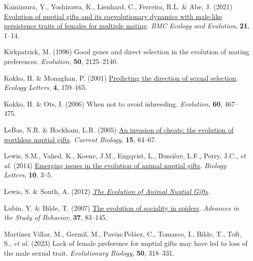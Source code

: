 \documentclass[
]{article}
\newlength{\cslhangindent}
\newlength{\cslentryspacingunit} %
\newenvironment{CSLReferences}[2] %
 {%
  \setlength{\parindent}{0pt}
  \ifodd #1
  \let\oldpar\par
  \def\par{\hangindent=\cslhangindent\oldpar}
  \fi
  \setlength{\parskip}{#2\cslentryspacingunit}
 }%
 {}
\begin{document}
\begin{CSLReferences}{0}{0}
\leavevmode{}%
Kamimura, Y., Yoshizawa, K., Lienhard, C., Ferreira, R.L. \& Abe, J.
(2021) \href{https://doi.org/10.1186/s12862-021-01901-x}{{Evolution of
nuptial gifts and its coevolutionary dynamics with male-like persistence
traits of females for multiple mating}}. \emph{BMC Ecology and
Evolution}, \textbf{21}, 1--14.

\leavevmode{}%
Kirkpatrick, M. (1996) Good genes and direct selection in the evolution
of mating preferences. \emph{Evolution}, \textbf{50}, 2125--2140.

\leavevmode{}%
Kokko, H. \& Monaghan, P. (2001)
\href{https://doi.org/10.1046/j.1461-0248.2001.00212.x}{{Predicting the
direction of sexual selection}}. \emph{Ecology Letters}, \textbf{4},
159--165.

\leavevmode{}%
Kokko, H. \& Ots, I. (2006) {When not to avoid inbreeding}.
\emph{Evolution}, \textbf{60}, 467--475.

\leavevmode{}%
LeBas, N.R. \& Hockham, L.R. (2005) \href{https://doi.org/10.1016/j}{{An
invasion of cheats: the evolution of worthless nuptial gifts}}.
\emph{Current Biology}, \textbf{15}, 64--67.

\leavevmode{}%
Lewis, S.M., Vahed, K., Koene, J.M., Engqvist, L., Bussière, L.F.,
Perry, J.C., \emph{et al.} (2014)
\href{https://doi.org/10.1098/rsbl.2014.0336}{{Emerging issues in the
evolution of animal nuptial gifts}}. \emph{Biology Letters},
\textbf{10}, 3--5.

\leavevmode{}%
Lewis, S. \& South, A. (2012)
\emph{\href{https://doi.org/10.1016/B978-0-12-394288-3.00002-2}{{The
Evolution of Animal Nuptial Gifts}}}.

\leavevmode{}%
Lubin, Y. \& Bilde, T. (2007)
\href{https://doi.org/10.1016/S0065-3454(07)37003-4}{{The evolution of
sociality in spiders}}. \emph{Advances in the Study of Behavior},
\textbf{37}, 83--145.

\leavevmode{}%
Martínez Villar, M., Germil, M., Pavón-Peláez, C., Tomasco, I., Bilde,
T., Toft, S., \emph{et al.} (2023) Lack of female preference for nuptial
gifts may have led to loss of the male sexual trait. \emph{Evolutionary
Biology}, \textbf{50}, 318--331.


\end{CSLReferences}
\end{document}
